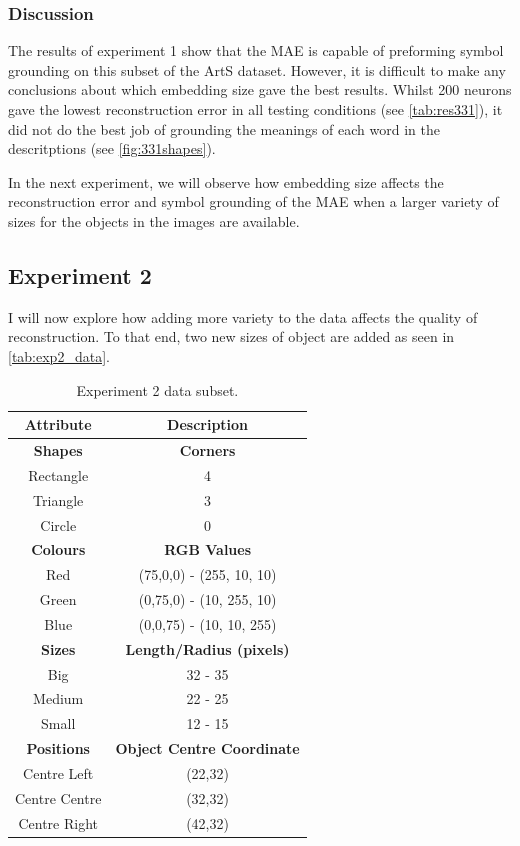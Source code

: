 \subsubsection{Discussion}
The results of experiment 1 show that the \ac{MAE} is capable of preforming symbol grounding on this subset of the ArtS dataset. However, it is difficult to make any conclusions about which embedding size gave the best results. Whilst 200 neurons gave the lowest reconstruction error in all testing conditions (see \autoref{tab:res331}), it did not do the best job of grounding the meanings of each word in the descritptions (see \autoref{fig:331shapes}). 

In the next experiment, we will observe how embedding size affects the reconstruction error and symbol grounding of the \ac{MAE} when a larger variety of sizes for the objects in the images are available.


\newpage
\subsection{Experiment 2}
I will now explore how adding more variety to the data affects the quality of reconstruction. To that end, two new sizes of object are added as seen in \autoref{tab:exp2_data}. 

\begin{table}[ht]
\centering
\begin{tabular}{|c|c|}
\hline
\textbf{Attribute} & \textbf{Description} \\ \hline \hline
\textbf{Shapes} & \textbf{Corners} \\ \hline
Rectangle & 4\\ \hline
Triangle & 3\\ \hline
Circle & 0\\ \hline 

\textbf{Colours} & \textbf{RGB Values}	\\ \hline	
Red & (75,0,0) - (255, 10, 10)\\ \hline
Green  & (0,75,0) - (10, 255, 10)\\ \hline
Blue   & (0,0,75) - (10, 10, 255)\\ \hline


\textbf{Sizes} & 	\textbf{Length/Radius (pixels)} \\ \hline			  
Big    & 32 - 35  \\ \hline
Medium & 22 - 25 \\ \hline
Small  & 12 - 15 \\ \hline 

\textbf{Positions} & \textbf{Object Centre Coordinate}	\\ \hline					  
Centre Left &(22,32)\\ \hline
Centre Centre & (32,32)\\ \hline
Centre Right &(42,32)\\ \hline				
\end{tabular}
\caption{Experiment 2 data subset.}
\label{tab:exp2_data} 
\end{table}



